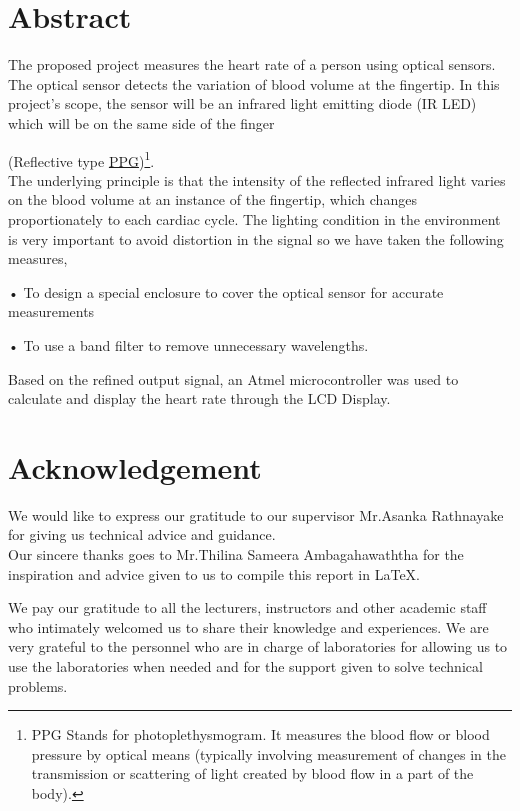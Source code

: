 \documentclass[12pt]{article}
\begin{document}
\section{Abstract}
The proposed project measures the heart rate of a person using optical sensors. 
The optical sensor detects the variation of blood volume at the fingertip.
In this project's scope, the sensor will be an infrared light emitting diode (IR LED) which will be on the same side of the finger{(Reflective type \hyperref[sec:ppg]{PPG})\footnote{PPG Stands for photoplethysmogram. It measures the blood flow or blood pressure by optical means (typically involving measurement of changes in the transmission or scattering of light created by blood flow in a part of the body)\cite{PPG_meaning}.}.\\
The underlying principle is that the intensity of the reflected infrared light varies on the blood volume at an instance of the fingertip, which changes proportionately to each cardiac cycle. 
The lighting condition in the environment is very important to avoid distortion in the signal so we have taken the following measures,

• To design a special enclosure to cover the optical sensor for accurate measurements

• To use a band filter to remove unnecessary wavelengths.

Based on the refined output signal, an Atmel microcontroller was used to calculate and display the heart rate through the LCD Display.

\section{Acknowledgement}
We would like to express our gratitude to our supervisor Mr.Asanka Rathnayake for giving us technical advice and guidance.\\
Our sincere thanks goes to Mr.Thilina Sameera Ambagahawaththa for the inspiration and advice given to us to compile this report in \LaTeX.

We pay our gratitude to all the lecturers, instructors and other academic staff who intimately welcomed us to share their knowledge and experiences. We are very grateful to the personnel who are in charge of laboratories for allowing us to use the laboratories when needed and for the support given to solve technical problems.

\newpage
\tableofcontents
\pagebreak


}
\end{document}
